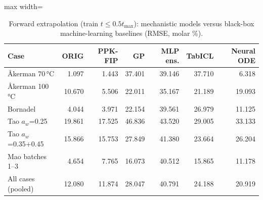 \begin{table}[t]
\centering
\caption{Forward extrapolation (train $t\le0.5t_\mathrm{max}$): mechanistic models versus black-box machine-learning baselines (RMSE, molar \%).}\label{tab:fcstbb}
\footnotesize
\begin{adjustbox}{max width=\linewidth}
\begin{tabular}{lrrrrrr}
\toprule
Case & ORIG & PPK-FIP & GP & MLP ens. & TabICL & Neural ODE \\
\midrule
Åkerman 70\,°C & 1.097 & 1.443 & 37.401 & 39.146 & 37.710 & 6.318 \\
Åkerman 100\,°C & 10.670 & 5.506 & 22.011 & 35.167 & 21.189 & 19.093 \\
Bornadel & 4.044 & 3.971 & 22.154 & 39.561 & 26.979 & 11.125 \\
Tao $a_w$=0.25 & 19.861 & 17.525 & 46.836 & 43.520 & 29.005 & 33.133 \\
Tao $a_w$=0.35+0.45 & 15.866 & 15.753 & 27.849 & 41.380 & 23.664 & 26.204 \\
Mao batches 1--3 & 4.654 & 7.765 & 16.073 & 40.512 & 15.865 & 11.178 \\
\midrule
All cases (pooled) & 12.080 & 11.874 & 28.047 & 40.791 & 24.188 & 20.919 \\
\bottomrule
\end{tabular}
\end{adjustbox}
\end{table}

